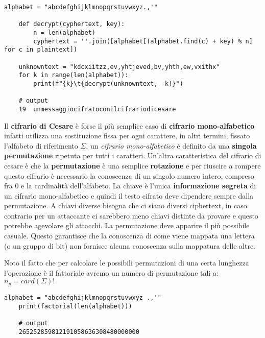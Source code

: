 \begin{lstlisting}[label=lst:ceaser-bruteforce, basicstyle=\small]
    alphabet = "abcdefghijklmnopqrstuvwxyz.,'"

    def decrypt(cyphertext, key):
        n = len(alphabet)
        cyphertext = ''.join([alphabet[(alphabet.find(c) + key) % n] for c in plaintext])

    unknowntext = "kdcxiitzz,ev,yhtjeved,bv,yhth,ew,vxithx"
    for k in range(len(alphabet)):
        print(f"{k}\t{decrypt(unknowntext, -k)}")
    
    # output
    19	unmessaggiocifratoconilcifrariodicesare
\end{lstlisting}

Il \textbf{cifrario di Cesare} è forse il più semplice caso di \textbf{cifrario mono-alfabetico} infatti utilizza una sostituzione fissa per ogni carattere, in altri termini, fissato l'alfabeto di riferimento $\Sigma$, un \textit{cifrario mono-alfabetico} è definito da una \textbf{singola permutazione} ripetuta per tutti i caratteri. Un'altra caratteristica del cifrario di cesare è che la \textbf{permutazione} è una semplice \textbf{rotazione} e per riuscire a rompere questo cifrario è necessario la conoscenza di un singolo numero intero, compreso fra 0 e la cardinalità dell'alfabeto. La chiave è l'unica \textbf{informazione segreta} di un cifrario mono-alfabetico e quindi il testo cifrato deve dipendere sempre dalla permutazione. A chiavi diverse bisogna che ci siano diversi ciphertext, in caso contrario per un attaccante ci sarebbero meno chiavi distinte da provare e questo potrebbe agevolare gli attacchi. La permutazione deve apparire il più possibile casuale. Questo garantisce che la conoscenza di come viene mappata una lettera (o un gruppo di bit) non fornisce alcuna conoscenza sulla mappatura delle altre. 

\newpage
Noto il fatto che per calcolare le possibili permutazioni di una certa lunghezza l'operazione è il fattoriale avremo un numero di permutazione tali a: $n_p = card(\Sigma)!$

\begin{lstlisting}[label=lst:n-perm, basicstyle=\small]
    alphabet = "abcdefghijklmnopqrstuvwxyz .,'"
    print(factorial(len(alphabet)))

    # output
    265252859812191058636308480000000
\end{lstlisting}

